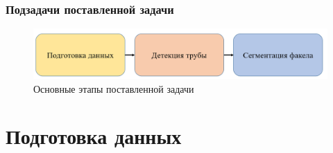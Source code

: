 \documentclass[t]{beamer}
\begin{document}
	\begin{frame}
		\frametitle{Подзадачи поставленной задачи} 
		\vspace{1.8cm}
		\begin{figure}
			\centering
			\includegraphics[width = \textwidth]{image/scheme2_upd}
			\caption{Основные этапы поставленной задачи}
			\label{fig:scheme2_upd}
		\end{figure}
	\end{frame}

\section{Подготовка данных}

\end{document}
